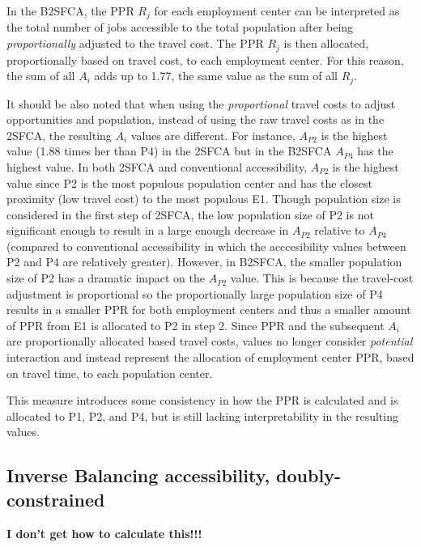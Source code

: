 \documentclass[]{elsarticle} %
\begin{document}
In the B2SFCA, the PPR \(R_{j}\) for each employment center can be
interpreted as the total number of jobs accessible to the total
population after being \emph{proportionally} adjusted to the travel
cost. The PPR \(R_{j}\) is then allocated, proportionally based on
travel cost, to each employment center. For this reason, the sum of all
\(A_{i}\) adds up to 1.77, the same value as the sum of all \(R_{j}\).

It should be also noted that when using the \emph{proportional} travel
costs to adjust opportunities and population, instead of using the raw
travel costs as in the 2SFCA, the resulting \(A_{i}\) values are
different. For instance, \(A_{P2}\) is the highest value (1.88 times her
than P4) in the 2SFCA but in the B2SFCA \(A_{P4}\) has the highest
value. In both 2SFCA and conventional accessibility, \(A_{P2}\) is the
highest value since P2 is the most populous population center and has
the closest proximity (low travel cost) to the most populous E1. Though
population size is considered in the first step of 2SFCA, the low
population size of P2 is not significant enough to result in a large
enough decrease in \(A_{P2}\) relative to \(A_{P4}\) (compared to
conventional accessibility in which the acccesibility values between P2
and P4 are relatively greater). However, in B2SFCA, the smaller
population size of P2 has a dramatic impact on the \(A_{P2}\) value.
This is because the travel-cost adjustment is proportional so the
proportionally large population size of P4 results in a smaller PPR for
both employment centers and thus a smaller amount of PPR from E1 is
allocated to P2 in step 2. Since PPR and the subsequent \(A_{i}\) are
proportionally allocated based travel costs, values no longer consider
\emph{potential} interaction and instead represent the allocation of
employment center PPR, based on travel time, to each population center.

This measure introduces some consistency in how the PPR is calculated
and is allocated to P1, P2, and P4, but is still lacking
interpretability in the resulting values.

\hypertarget{inverse-balancing-accessibility-doubly-constrained}{%
\subsection{Inverse Balancing accessibility,
doubly-constrained}\label{inverse-balancing-accessibility-doubly-constrained}}

\textbf{I don't get how to calculate this!!!}
\end{document}
